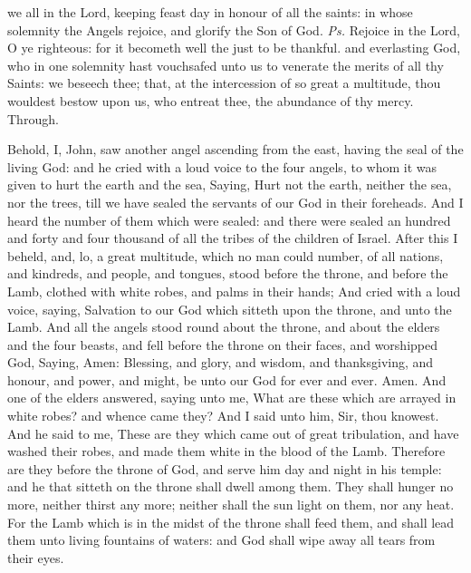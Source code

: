 \introit
{} we all in the Lord, keeping feast day in honour of all the saints: in whose solemnity the Angels rejoice, and glorify the Son of God. \textit{Ps.} Rejoice in the Lord, O ye righteous: for it becometh well the just to be thankful.
\collect
 and everlasting God, who in one solemnity hast vouchsafed unto us to venerate the merits of all thy Saints: we beseech thee; that, at the intercession of so great a multitude, thou wouldest bestow upon us, who entreat thee, the abundance of thy mercy. Through.

 Behold, I, John, saw another angel ascending from the east, having the seal of the living God: and he cried with a loud voice to the four angels, to whom it was given to hurt the earth and the sea, Saying, Hurt not the earth, neither the sea, nor the trees, till we have sealed the servants of our God in their foreheads. And I heard the number of them which were sealed: and there were sealed an hundred and forty and four thousand of all the tribes of the children of Israel. After this I beheld, and, lo, a great multitude, which no man could number, of all nations, and kindreds, and people, and tongues, stood before the throne, and before the Lamb, clothed with white robes, and palms in their hands; And cried with a loud voice, saying, Salvation to our God which sitteth upon the throne, and unto the Lamb. And all the angels stood round about the throne, and about the elders and the four beasts, and fell before the throne on their faces, and worshipped God, Saying, Amen: Blessing, and glory, and wisdom, and thanksgiving, and honour, and power, and might, be unto our God for ever and ever. Amen. And one of the elders answered, saying unto me, What are these which are arrayed in white robes? and whence came they? And I said unto him, Sir, thou knowest. And he said to me, These are they which came out of great tribulation, and have washed their robes, and made them white in the blood of the Lamb. Therefore are they before the throne of God, and serve him day and night in his temple: and he that sitteth on the throne shall dwell among them. They shall hunger no more, neither thirst any more; neither shall the sun light on them, nor any heat. For the Lamb which is in the midst of the throne shall feed them, and shall lead them unto living fountains of waters: and God shall wipe away all tears from their eyes.

